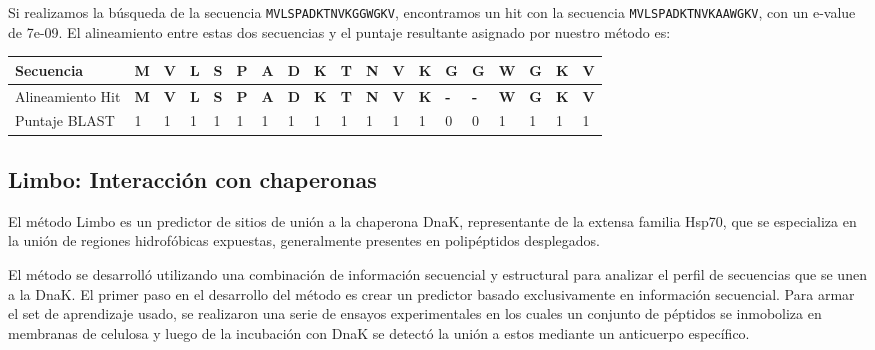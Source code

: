 Si realizamos la búsqueda de la secuencia \texttt{MVLSPADKTNVKGGWGKV}, encontramos un hit con la secuencia \texttt{MVLSPADKTNVKAAWGKV}, con un e-value de 7e-09. 
El alineamiento entre estas dos secuencias y el puntaje resultante asignado por nuestro método es:
\vspace{0.5cm}

\noindent
\begin{tabular}{lllllllllllllllllll} 
\hline
Secuencia 		& \textbf{M} & \textbf{V} & \textbf{L} & \textbf{S} & \textbf{P} & \textbf{A} & \textbf{D} & \textbf{K} & \textbf{T} & \textbf{N} & \textbf{V} & \textbf{K} & \textbf{G} & \textbf{G} & \textbf{W} & \textbf{G} & \textbf{K} & \textbf{V}\\ \hline
Alineamiento Hit	& \textbf{M} & \textbf{V} & \textbf{L} & \textbf{S} & \textbf{P} & \textbf{A} & \textbf{D} & \textbf{K} & \textbf{T} & \textbf{N} & \textbf{V} & \textbf{K} & \textbf{-} & \textbf{-} & \textbf{W} & \textbf{G} & \textbf{K} & \textbf{V}\\ \hline
Puntaje BLAST 		& 1 & 1 & 1 & 1 & 1 & 1 & 1 & 1 & 1 & 1 & 1 & 1 & 0 & 0 & 1 & 1 & 1 & 1 \\ \hline
\end{tabular}




















\subsection{Limbo: Interacción con chaperonas} \label{limbo}
El método Limbo\cite{van2009accurate} es un predictor de sitios de unión a la chaperona DnaK, representante de la extensa familia Hsp70, que se especializa en la unión de regiones hidrofóbicas expuestas, generalmente
presentes en polipéptidos desplegados. 

El método se desarrolló utilizando una combinación de información secuencial y estructural para analizar el perfil de secuencias que se unen a la DnaK.
El primer paso en el desarrollo del método es crear un predictor basado exclusivamente en información secuencial.
Para armar el set de aprendizaje usado, se realizaron una serie de ensayos experimentales en los cuales un conjunto de péptidos se inmoboliza en membranas de celulosa 
y luego de la incubación con DnaK se detectó la unión a estos mediante un anticuerpo específico.


